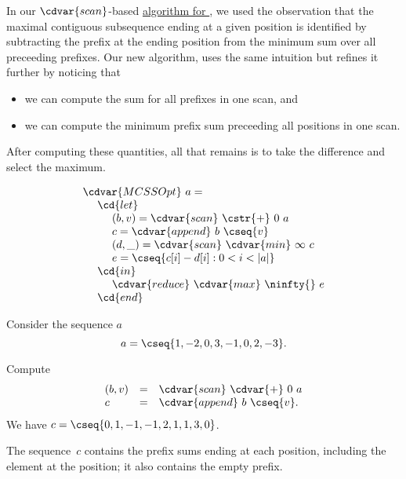 \begin{flex}
\begin{algorithm}

In our $\cdvar{scan}$-based 
%
\href{alg:mcss::reduction:mcsse}{algorithm for \MCSSE{}},
%
we used the observation that 
%
the maximal contiguous subsequence ending at a given position is
identified by subtracting the prefix at the ending position from the
minimum sum over all preceeding prefixes.
%
Our new algorithm,  uses the same intuition but refines it
further by noticing that
\begin{itemize}
\item we can compute the sum for all prefixes in one
  scan, and
\item we can compute the minimum prefix sum preceeding all positions in one scan.
\end{itemize}

After computing these quantities, all that remains is to take the
difference and select the maximum.

%
\[
\begin{array}{l}
\cdvar{MCSSOpt}~a =
\\
~~~~\cd{let}
\\
~~~~~~~~(b,v) = \cdvar{scan}~\cstr{+}~0~a
\\
~~~~~~~~c = \cdvar{append}~b~\cseq{v}
\\
~~~~~~~~(d,\_) = \cdvar{scan}~\cdvar{min}~\infty~c
\\
~~~~~~~~e = \cseq{c[i]-d[i]: 0 < i < |a|}
\\
~~~~\cd{in}
\\
~~~~~~~~\cdvar{reduce}~\cdvar{max}~\ninfty{}~e
\\
~~~~\cd{end}
\end{array}
\]
\end{algorithm}
%


\begin{example}
\label{ex:mcs:scan-based}
Consider the sequence $a$
\[
a = \cseq{1, -2, 0, 3, -1, 0, 2, -3}.
\]

Compute
\[
\begin{array}{lcl}
(b,v) & = & \cdvar{scan}~\cdvar{+}~0~a
\\
c  & = & \cdvar{append}~ b~ \cseq{v}.
\end{array}
\]
We have $c =  \cseq{0, 1, -1, -1, 2, 1, 1, 3, 0}$.

The sequence~$c$ contains the prefix sums ending at each position,
including the element at the position; it also contains the empty
prefix.


\end{example}
\end{flex}
